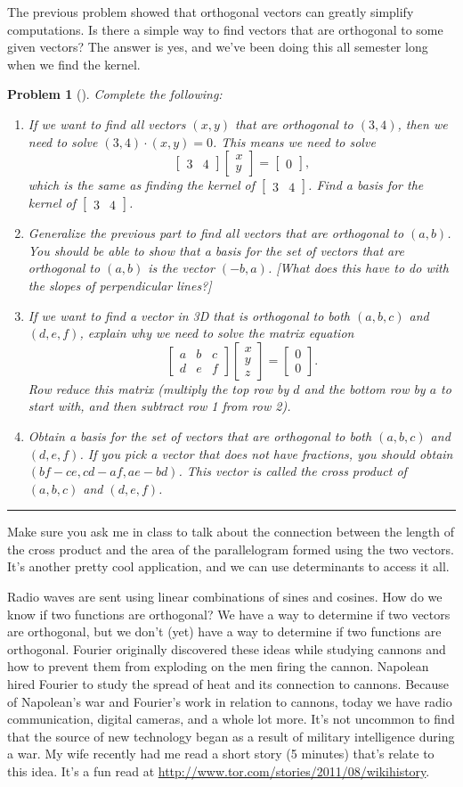\documentclass[letterpaper,oneside]{book}%
\theoremstyle{plain}
\theoremstyle{box}
\theoremstyle{problem}
\newtheorem{problemnum}{Problem}[chapter]
\newenvironment{problem}[1][]{\begin{problemnum}[#1]}{\end{problemnum}\nopagebreak\hrule\bigskip}
\newcommand{\bvec}[1]{\begin{bmatrix} #1 \end{bmatrix}}
\begin{document}
The previous problem showed that orthogonal vectors can greatly simplify computations. Is there a simple way to find vectors that are orthogonal to some given vectors?  The answer is yes, and we've been doing this all semester long when we find the kernel.
\begin{problem}
Complete the following:
\begin{enumerate}
 \item If we want to find all vectors $(x,y)$ that are orthogonal to $(3,4)$, then we need to solve $(3,4)\cdot (x,y) = 0$.  This means we need to solve $$\bvec{3&4}\bvec{x\\y}=\bvec 0,$$ which is the same as finding the kernel of $\bvec{3&4}$.  Find a basis for the kernel of $\bvec{3&4}$. 
 \item Generalize the previous part to find all vectors that are orthogonal to $(a,b)$.  You should be able to show that a basis for the set of vectors that are orthogonal to $(a,b)$ is the vector $(-b,a)$. [What does this have to do with the slopes of perpendicular lines?]
 \item If we want to find a vector in 3D that is orthogonal to both $(a,b,c)$ and $(d,e,f)$, explain why we need to solve the matrix equation
 $$\bvec{a&b&c\\d&e&f}\bvec{x\\y\\z}=\bvec{0\\0}.$$
 Row reduce this matrix (multiply the top row by $d$ and the bottom row by $a$ to start with, and then subtract row 1 from row 2). 
 \item Obtain a basis for the set of vectors that are orthogonal to both $(a,b,c)$ and $(d,e,f)$. If you pick a vector that does not have fractions, you should obtain $(bf-ce,cd-af, ae-bd)$.  This vector is called the cross product of $(a,b,c)$ and $(d,e,f)$.  
\end{enumerate} 
\end{problem}

Make sure you ask me in class to talk about the connection between the length of the cross product and the area of the parallelogram formed using the two vectors.  It's another pretty cool application, and we can use determinants to access it all.

Radio waves are sent using linear combinations of sines and cosines. How do we know if two functions are orthogonal? We have a way to determine if two vectors are orthogonal, but we don't (yet) have a way to determine if two functions are orthogonal. Fourier originally discovered these ideas while studying cannons and how to prevent them from exploding on the men firing the cannon. Napolean hired Fourier to study the spread of heat and its connection to cannons.  Because of Napolean's war and Fourier's work in relation to cannons, today we have radio communication, digital cameras, and a whole lot more. It's not uncommon to find that the source of new technology began as a result of military intelligence during a war. My wife recently had me read a short story (5 minutes) that's relate to this idea.  It's a fun read at \href{http://www.tor.com/stories/2011/08/wikihistory}{http://www.tor.com/stories/2011/08/wikihistory}.
\end{document}
